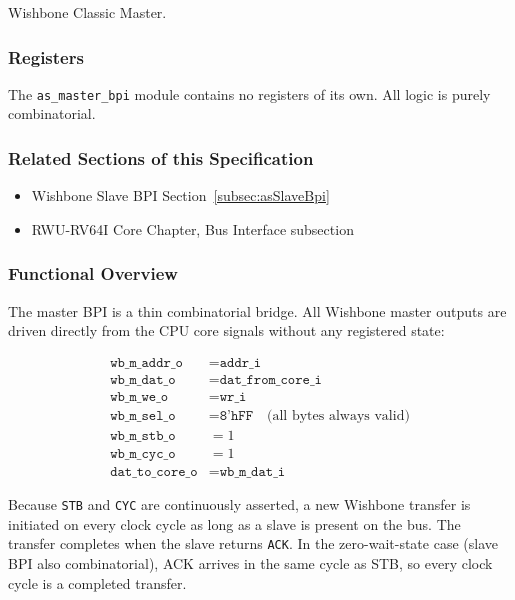Wishbone Classic Master.

\subsubsection{Registers}

The \texttt{as\_master\_bpi} module contains no registers of its own.
All logic is purely combinatorial.

\subsubsection{Related Sections of this Specification}

\begin{itemize}
  \item Wishbone Slave BPI Section~\ref{subsec:asSlaveBpi}
  \item RWU-RV64I Core Chapter, Bus Interface subsection
\end{itemize}

\subsubsection{Functional Overview}

The master BPI is a thin combinatorial bridge.
All Wishbone master outputs are driven directly from the CPU core signals
without any registered state:

\begin{align*}
  \texttt{wb\_m\_addr\_o} &= \texttt{addr\_i} \\
  \texttt{wb\_m\_dat\_o}  &= \texttt{dat\_from\_core\_i} \\
  \texttt{wb\_m\_we\_o}   &= \texttt{wr\_i} \\
  \texttt{wb\_m\_sel\_o}  &= \texttt{8'hFF} \quad \text{(all bytes always valid)} \\
  \texttt{wb\_m\_stb\_o}  &= 1 \\
  \texttt{wb\_m\_cyc\_o}  &= 1 \\
  \texttt{dat\_to\_core\_o} &= \texttt{wb\_m\_dat\_i}
\end{align*}

Because \texttt{STB} and \texttt{CYC} are continuously asserted, a new
Wishbone transfer is initiated on every clock cycle as long as a slave is
present on the bus.
The transfer completes when the slave returns \texttt{ACK}.
In the zero-wait-state case (slave BPI also combinatorial), ACK arrives
in the same cycle as STB, so every clock cycle is a completed transfer.

